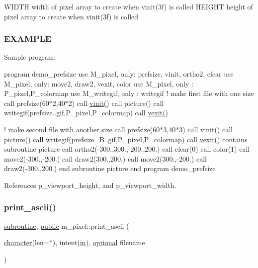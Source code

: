 W\+I\+D\+TH width of pixel array to create when vinit(3f) is called H\+E\+I\+G\+HT height of pixel array to create when vinit(3f) is called

\subsubsection*{E\+X\+A\+M\+P\+LE}

Sample program\+:

program demo\+\_\+prefsize use M\+\_\+pixel, only\+: prefsize, vinit, ortho2, clear use M\+\_\+pixel, only\+: move2, draw2, vexit, color use M\+\_\+pixel, only \+: P\+\_\+pixel,P\+\_\+colormap use M\+\_\+writegif, only \+: writegif ! make first file with one size call prefsize(60$\ast$2,40$\ast$2) call \hyperlink{namespacem__pixel_ac03ca8f23fdadb60599b6ea4dc87a6d9}{vinit()} call picture() call writegif(\textquotesingle{}prefsize..\+gif\textquotesingle{},P\+\_\+pixel,P\+\_\+colormap) call \hyperlink{namespacem__pixel_a19ad6b65752322b0029a62cc0ebec3e8}{vexit()}

! make second file with another size call prefsize(60$\ast$3,40$\ast$3) call \hyperlink{namespacem__pixel_ac03ca8f23fdadb60599b6ea4dc87a6d9}{vinit()} call picture() call writegif(\textquotesingle{}prefsize\+\_\+\+B..\+gif\textquotesingle{},P\+\_\+pixel,P\+\_\+colormap) call \hyperlink{namespacem__pixel_a19ad6b65752322b0029a62cc0ebec3e8}{vexit()} contains subroutine picture call ortho2(-\/300.,300.,-\/200.,200.) call clear(0) call color(1) call move2(-\/300.,-\/200.) call draw2(300.,200.) call move2(300.,-\/200.) call draw2(-\/300.,200.) end subroutine picture end program demo\+\_\+prefsize 

References p\+\_\+viewport\+\_\+height, and p\+\_\+viewport\+\_\+width.

\mbox{\label{namespacem__pixel_ab2bb47aea567667b1b92c8265bcb36fb}} 
\subsubsection{\texorpdfstring{print\+\_\+ascii()}{print\_ascii()}}
{\footnotesize\ttfamily \hyperlink{M__stopwatch_83_8txt_acfbcff50169d691ff02d4a123ed70482}{subroutine}, \hyperlink{M__stopwatch_83_8txt_a2f74811300c361e53b430611a7d1769f}{public} m\+\_\+pixel\+::print\+\_\+ascii (\begin{DoxyParamCaption}\item[{\hyperlink{option__stopwatch_83_8txt_abd4b21fbbd175834027b5224bfe97e66}{character}(len=$\ast$), intent(\hyperlink{M__journal_83_8txt_afce72651d1eed785a2132bee863b2f38}{in}), \hyperlink{option__stopwatch_83_8txt_aa4ece75e7acf58a4843f70fe18c3ade5}{optional}}]{filename }\end{DoxyParamCaption})}




